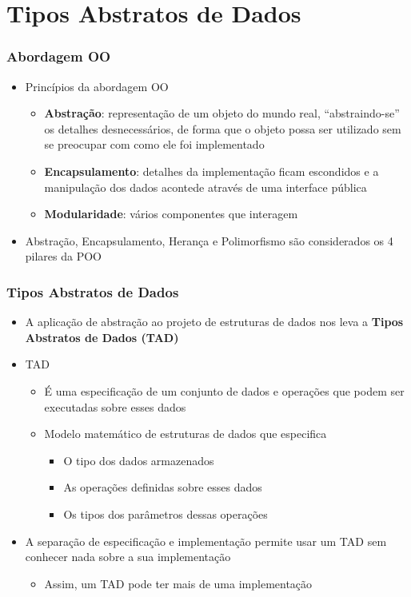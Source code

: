 \documentclass[aspectratio=169]{beamer}
\begin{document}
\section{Tipos Abstratos de Dados}

\begin{frame}\frametitle{Abordagem OO}
\begin{itemize}
	\item Princípios da abordagem OO
	\begin{itemize}
		\item \textbf{Abstração}: representação de um objeto do mundo real, ``abstraindo-se'' os detalhes desnecessários, de forma que o objeto possa ser utilizado sem se preocupar com como ele foi implementado
		\item \textbf{Encapsulamento}: detalhes da implementação ficam escondidos e a manipulação dos dados acontede através de uma interface pública
		\item \textbf{Modularidade}: vários componentes que interagem
	\end{itemize}
	\item Abstração, Encapsulamento, Herança e Polimorfismo são considerados os 4 pilares da POO
\end{itemize}
\end{frame}

\begin{frame}\frametitle{Tipos Abstratos de Dados}
\begin{itemize}
	\item A aplicação de abstração ao projeto de estruturas de dados nos leva a \textbf{Tipos Abstratos de Dados (TAD)}
	\item TAD
	\begin{itemize}
		\item É uma especificação de um conjunto de dados e operações que podem ser executadas sobre esses dados
		\item Modelo matemático de estruturas de dados que especifica
		\begin{itemize}
			\item O tipo dos dados armazenados
			\item As operações definidas sobre esses dados
			\item Os tipos dos parâmetros dessas operações
		\end{itemize}
	\end{itemize}
	\item A separação de especificação e implementação permite usar um TAD sem conhecer nada sobre a sua implementação
	\begin{itemize}
		\item Assim, um TAD pode ter mais de uma implementação
	\end{itemize}
\end{itemize}
\end{frame}
\end{document}
